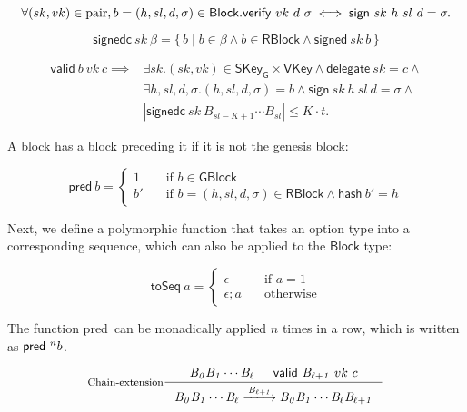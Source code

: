 \documentclass[11pt,a4paper]{article}
\newcommand\Set[2]{\{\,#1\mid#2\,\}}
\newcommand{\var}[1]{\mathit{#1}}
\newcommand{\fun}[1]{\mathsf{#1}}
\newcommand{\type}[1]{\mathsf{#1}}
\newcommand{\trans}[2]{\xlongrightarrow[\textsc{#1}]{#2}}
\newcommand{\GBlock}{\type{GBlock}}
\newcommand{\RBlock}{\type{RBlock}}
\newcommand{\Block}{\type{Block}}
\newcommand{\SKeyGen}{\type{SKey_G}}
\newcommand{\VKey}{\type{VKey}}
\newcommand{\hashname}{hash}
\newcommand{\signname}{sign}
\newcommand{\signedname}{signed}
\newcommand{\signedseqname}{signedc}
\newcommand{\verifyname}{verify}
\newcommand{\delegatename}{delegate}
\newcommand{\validname}{valid}
\newcommand{\keypairname}{pair}
\newcommand{\predbname}{pred} %
\newcommand{\toseqname}{toSeq} %
\newcommand{\sign}[4]{\fun{\signname}\ #1 ~ #2 ~ #3 ~ #4}
\newcommand{\signed}[2]{\fun{\signedname}\ #1 ~ #2}
\newcommand{\signedwindow}[2]{\fun{\signedseqname}\ #1 ~ #2}
\newcommand{\verify}[3]{\fun{\verifyname} ~ #1 ~ #2 ~ #3}
\newcommand{\hash}[1]{\fun{\hashname}\ #1}
\newcommand{\delegate}[1]{\fun{\delegatename}\ #1}
\newcommand{\valid}[3]{\fun{\validname} ~ #1 ~ #2 ~ #3}
\newcommand{\predb}[1]{\fun{\predbname} ~ #1}
\newcommand{\toseq}[1]{\fun{\toseqname} ~ #1}
\begin{document}
\begin{equation}
  \label{eq:sign-verify}
  \forall (sk, vk) \in \text{\keypairname}, b = (h, sl, d, \sigma) \in \Block.\\
  \verify{vk}{d}{\sigma} \iff \sign{sk}{h}{sl}{d} = \sigma.
\end{equation}

\begin{equation}
  \label{eq:signed-window}
  \signedwindow{sk}{\beta} = \Set{b}{b \in \beta \wedge b \in \RBlock \wedge \signed{sk}{b}}
\end{equation}

\begin{align}
  \label{eq:valid-block}
    \valid{b}{vk}{c} \implies &
      \exists sk. (sk, vk) \in \SKeyGen \times \VKey \wedge
      \delegate{sk} = c \wedge \\
      & \exists h, sl, d, \sigma. (h, sl, d, \sigma) = b \wedge
        \sign{sk}{h}{sl}{d} = \sigma \wedge \\
      & | \signedwindow{sk}{\var{B_{sl-K+1}} \cdots \var{B_{sl}}} | \leq K \cdot t.
\end{align}

A block has a block preceding it if it is not the genesis block:

\begin{equation}
  \label{eq:predb}
  \predb{b} =
  \begin{cases}
    1 & \quad \text{if } b \in \GBlock \\
    b' & \quad \text{if } b = (h, sl, d, \sigma) \in \RBlock \wedge \hash{b'} = h
  \end{cases}
\end{equation}

Next, we define a polymorphic function that takes an option type into a
corresponding sequence, which can also be applied to the $\Block$ type:

\begin{equation}
  \label{eq:toseq}
  \toseq{a} =
  \begin{cases}
    \epsilon & \quad \text{if } a = 1 \\
    \epsilon; a & \quad \text{otherwise}
  \end{cases}
\end{equation}

The function \predbname\ can be monadically applied $n$ times in a row, which
is written as $\predb^n{b}$.


\begin{equation}
  \label{eq:chain-extension}
  \inference[Chain-extension]
  {\var{B_0}\var{B_1}\cdots\var{B_{\ell}} & \valid{\var{B_{\ell+1}}}{vk}{c}
  }
  {{\var{B_0}\var{B_1}\cdots\var{B_{\ell}}} \trans{}{\var{B_{\ell+1}}} {\var{B_0}\var{B_1}\cdots\var{B_{\ell}}\var{B_{\ell+1}}}}
\end{equation}
\end{document}
